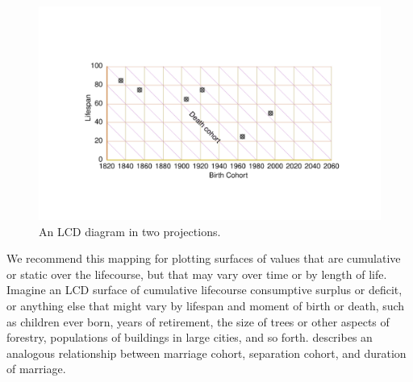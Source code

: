 \documentclass[12pt,oneside,a4paper]{article} %
\begin{document}
\begin{figure}[h!] 
\caption{An LCD diagram in two projections.}
\label{fig:LCD}
\centering
\vspace{-5em}
\includegraphics[scale=0.8]{Figures/LCDrt.pdf}
\end{figure} 

We
recommend this mapping for plotting surfaces of values that are cumulative or
static over the lifecourse, but that may vary over time or by length of life.
Imagine an LCD surface of cumulative lifecourse consumptive surplus or deficit, or anything else that might vary by lifespan and
moment of birth or death, such as children ever born, years of retirement, the
size of trees or other aspects of forestry, populations of buildings in large
cities, and so forth. \citet{lexis1875einleitung} describes an analogous
relationship between marriage cohort, separation cohort, and duration of
marriage.
\end{document}
